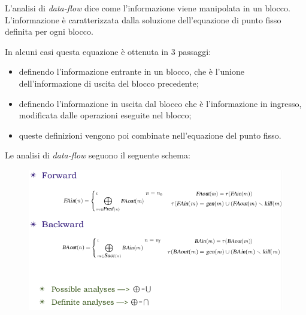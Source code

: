 \documentclass[a4paper, 10pt]{book}
\begin{document}
\noindent
L'analisi di \textit{data-flow} dice come l'informazione viene manipolata in un blocco. L'informazione è caratterizzata dalla soluzione dell'equazione di punto fisso definita per ogni blocco.

\noindent
In alcuni casi questa equazione è ottenuta in 3 passaggi: \begin{itemize}
	\item definendo l'informazione entrante in un blocco, che è l'unione dell'informazione di uscita del blocco precedente;
	\item definendo l'informazione in uscita dal blocco che è l'informazione in ingresso, modificata dalle operazioni eseguite nel blocco;
	\item queste definizioni vengono poi combinate nell'equazione del punto fisso.
\end{itemize}

Le analisi di \textit{data-flow} seguono il seguente schema:
\begin{figure}[H]
	\centering
	\includegraphics[scale=0.376]{pngs/FB}
\end{figure}

\newpage
\end{document}
